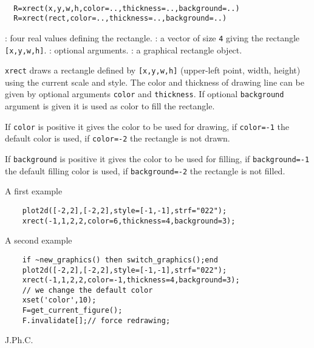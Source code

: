 
\begin{mandesc}
  \\ %
\end{mandesc}
\begin{calling_sequence}
\begin{verbatim}
  R=xrect(x,y,w,h,color=..,thickness=..,background=..)
  R=xrect(rect,color=..,thickness=..,background=..)
\end{verbatim}
\end{calling_sequence}

\begin{parameters}
  \begin{varlist}
    : four real values defining the rectangle.
    : a vector of size \verb!4! giving the rectangle
    \verb![x,y,w,h]!.
    : optional arguments.
    : a graphical rectangle object.
  \end{varlist}
\end{parameters}

\begin{mandescription}
  \verb!xrect! draws a rectangle defined by \verb![x,y,w,h]!
  (upper-left point, width, height) using the current scale and style.
  The color and thickness of drawing line can be given by optional arguments
  \verb!color! and \verb!thickness!. If optional \verb!background!
  argument is given it is used as color to fill the rectangle.

  If \verb!color! is positive it gives the color to be used for drawing,
  if \verb!color=-1! the default color is used, if  \verb!color=-2! the
  rectangle is not drawn.

  If \verb!background! is positive it gives the color to be used for filling,
  if \verb!background=-1! the default filling color is used,
  if  \verb!background=-2! the rectangle is not filled.

\end{mandescription}

\begin{examples}

A first example


  \begin{Verbatim}
    plot2d([-2,2],[-2,2],style=[-1,-1],strf="022");
    xrect(-1,1,2,2,color=6,thickness=4,background=3);
  \end{Verbatim}

A second example

  \begin{Verbatim}
    if ~new_graphics() then switch_graphics();end
    plot2d([-2,2],[-2,2],style=[-1,-1],strf="022");
    xrect(-1,1,2,2,color=-1,thickness=4,background=3);
    // we change the default color
    xset('color',10);
    F=get_current_figure();
    F.invalidate[];// force redrawing;
  \end{Verbatim}
\end{examples}

\begin{manseealso}
   
\end{manseealso}

\begin{authors}
  J.Ph.C.
\end{authors}

